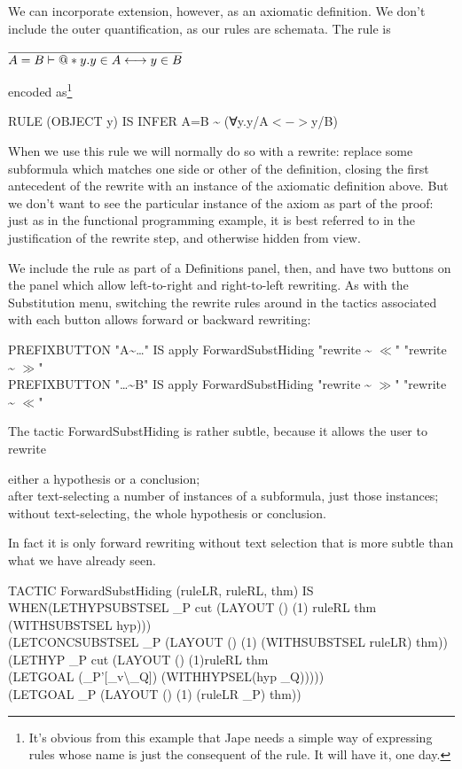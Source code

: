 \documentclass[11pt]{book}
\newcommand{\tab}{\hspace{5mm}}
\begin{document}
We can incorporate extension, however, as an axiomatic definition. We don't include the outer quantification, as our rules are schemata. The rule is


$\infer{A=B |- @*y.y\in A<->y\in B}
       {}$

encoded as\footnote{It's obvious from this example that Jape needs a simple way of expressing rules whose name is just the consequent of the rule. It will have it, one day.}

RULE (OBJECT y) IS INFER A=B \~{} (∀y.y/A$<->$y/B)


When we use this rule we will normally do so with a rewrite: replace some subformula which matches one side or other of the definition, closing the first antecedent of the rewrite with an instance of the axiomatic definition above. But we don't want to see the particular instance of the axiom as part of the proof: just as in the functional programming example, it is best referred to in the justification of the rewrite step, and otherwise hidden from view.


We include the rule as part of a Definitions panel, then, and have two buttons on the panel which allow left-to-right and right-to-left rewriting. As with the Substitution menu, switching the rewrite rules around in the tactics associated with each button allows forward or backward rewriting:

PREFIXBUTTON "A\~{}\dots " IS apply ForwardSubstHiding "rewrite \~{} $\ll$" "rewrite \~{} $\gg$"\\
PREFIXBUTTON "\dots \~{}B" IS apply ForwardSubstHiding "rewrite \~{} $\gg$" "rewrite \~{} $\ll$"


The tactic ForwardSubstHiding is rather subtle, because it allows the user to rewrite


{\textbullet}\tab either a hypothesis or a conclusion;\\
{\textbullet}\tab after text-selecting a number of instances of a subformula, just those instances;\\
{\textbullet}\tab without text-selecting, the whole hypothesis or conclusion.


In fact it is only forward rewriting without text selection that is more subtle than what we have already seen.

TACTIC ForwardSubstHiding (ruleLR, ruleRL, thm) IS\\
\tab WHEN\tab (LETHYPSUBSTSEL \_P cut (LAYOUT () (1) ruleRL thm (WITHSUBSTSEL hyp)))\\
\tab \tab (LETCONCSUBSTSEL \_P (LAYOUT () (1) (WITHSUBSTSEL ruleLR) thm))\\
\tab \tab (LETHYP \_P cut (LAYOUT () (1)\tab ruleRL thm \\
\tab \tab \tab (LETGOAL (\_P'[\_v{\textbackslash}\_Q]) (WITHHYPSEL(hyp \_Q)))))\\
\tab \tab (LETGOAL \_P (LAYOUT () (1) (ruleLR \_P) thm))
\end{document}
